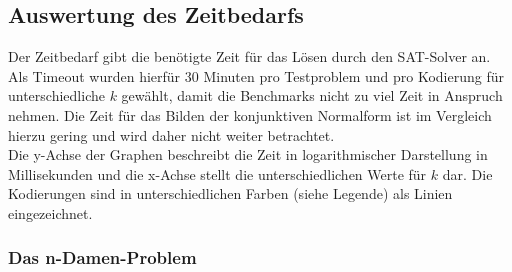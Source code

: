 \documentclass[a4,abstract=on]{scrartcl}
\begin{document}
\subsection{Auswertung des Zeitbedarfs}

Der Zeitbedarf gibt die benötigte Zeit für das Lösen durch den SAT-Solver an. Als Timeout wurden hierfür 30 Minuten pro Testproblem und pro Kodierung für unterschiedliche $k$ gewählt, damit die Benchmarks nicht zu viel Zeit in Anspruch nehmen. Die Zeit für das Bilden der konjunktiven Normalform ist im Vergleich hierzu gering und wird daher nicht weiter betrachtet.\\
Die y-Achse der Graphen beschreibt die Zeit in logarithmischer Darstellung in Millisekunden und die x-Achse stellt die unterschiedlichen Werte für $k$ dar. Die Kodierungen sind in unterschiedlichen Farben (siehe Legende) als Linien eingezeichnet.


\subsubsection*{Das n-Damen-Problem}

\end{document}
